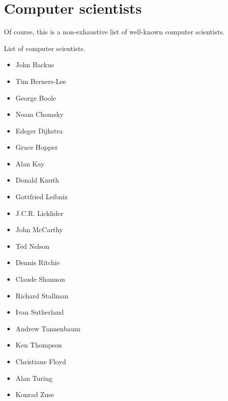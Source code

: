 \section{Computer scientists}
%
Of course, this is a non-exhaustive list of well-known computer scientists.

List of computer scientists.

\begin{itemize}
  \item John Backus
  \item Tim Berners-Lee
  \item George Boole
  \item Noam Chomsky
  \item Edsger Dijkstra
  \item Grace Hopper
  \item Alan Kay
  \item Donald Knuth
  \item Gottfried Leibniz
  \item J.C.R. Licklider
  \item John McCarthy
  \item Ted Nelson
  \item Dennis Ritchie
  \item Claude Shannon
  \item Richard Stallman
  \item Ivan Sutherland
  \item Andrew Tannenbaum
  \item Ken Thompson
  \item Christiane Floyd
  \item Alan Turing
  \item Konrad Zuse
\end{itemize}

